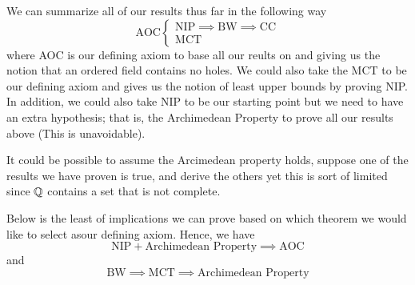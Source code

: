 We can summarize all of our results thus far in the following way 
\[ \text{AOC} 
\begin{cases}
    \text{NIP} \implies \text{BW} \implies \text{CC} \\ 
    \text{MCT} 
\end{cases}   \]
where AOC is our defining axiom to base all our reults on and giving us the notion that an ordered field contains no holes. We could also take the MCT to be our defining axiom and gives us the notion of least upper bounds by proving NIP. In addition, we could also take NIP to be our starting point but we need to have an extra hypothesis; that is, the Archimedean Property to prove all our results above (This is unavoidable).

It could be possible to assume the Arcimedean property holds, suppose one of the results we have proven is true, and derive the others yet this is sort of limited since \( \mathbb{Q} \) contains a set that is not complete. 

Below is the least of implications we can prove based on which theorem we would like to select asour defining axiom. Hence, we have
\[ \text{NIP} + \text{Archimedean Property} \implies \text{AOC} \] and 
\[ \text{BW} \implies \text{MCT} \implies \text{Archimedean Property}\]

